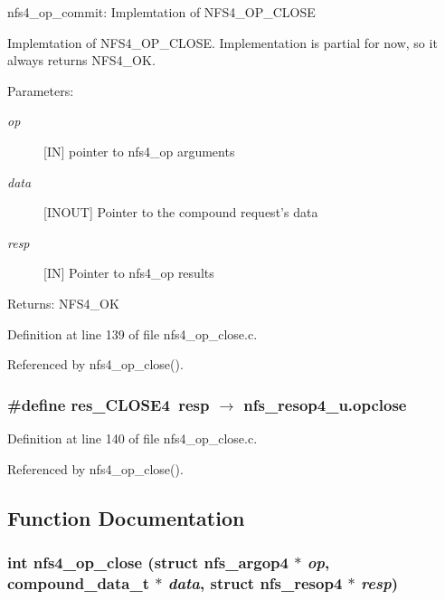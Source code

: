 nfs4\_\-op\_\-commit: Implemtation of NFS4\_\-OP\_\-CLOSE

Implemtation of NFS4\_\-OP\_\-CLOSE. Implementation is partial for now, so it always returns NFS4\_\-OK.

\begin{Desc}
\item[Parameters:]
\begin{description}
\item[{\em op}][IN] pointer to nfs4\_\-op arguments \item[{\em data}][INOUT] Pointer to the compound request's data \item[{\em resp}][IN] Pointer to nfs4\_\-op results\end{description}
\end{Desc}
\begin{Desc}
\item[Returns:]NFS4\_\-OK \end{Desc}


Definition at line 139 of file nfs4\_\-op\_\-close.c.

Referenced by nfs4\_\-op\_\-close().
\subsubsection{\setlength{\rightskip}{0pt plus 5cm}\#define res\_\-CLOSE4\ resp $\rightarrow$ nfs\_\-resop4\_\-u.opclose}\label{nfs4__op__close_8c_a1}




Definition at line 140 of file nfs4\_\-op\_\-close.c.

Referenced by nfs4\_\-op\_\-close().

\subsection{Function Documentation}
\subsubsection{\setlength{\rightskip}{0pt plus 5cm}int nfs4\_\-op\_\-close (struct nfs\_\-argop4 $\ast$ {\em op}, compound\_\-data\_\-t $\ast$ {\em data}, struct nfs\_\-resop4 $\ast$ {\em resp})}\label{nfs4__op__close_8c_a2}


